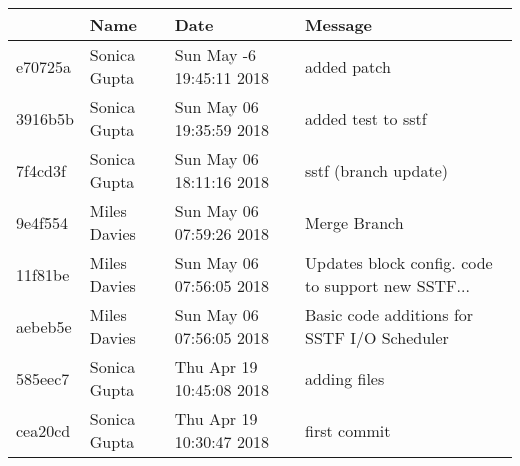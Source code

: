 \begin{table}[h]
\centering
\label{my-label}
\begin{tabular}{|l|l|l|l|}
\hline
        & Name         & Date                     & Message                                            \\ \hline
e70725a & Sonica Gupta & Sun May -6 19:45:11 2018 & added patch					       \\ \hline
3916b5b & Sonica Gupta & Sun May 06 19:35:59 2018 & added test to sstf				       \\ \hline
7f4cd3f & Sonica Gupta & Sun May 06 18:11:16 2018 & sstf (branch update) 			       \\ \hline
9e4f554 & Miles Davies & Sun May 06 07:59:26 2018 & Merge Branch			               \\ \hline
11f81be & Miles Davies & Sun May 06 07:56:05 2018 & Updates block config. code to support new SSTF...  \\ \hline
aebeb5e & Miles Davies & Sun May 06 07:56:05 2018 & Basic code additions for SSTF I/O Scheduler        \\ \hline
585eec7 & Sonica Gupta & Thu Apr 19 10:45:08 2018 & adding files	                               \\ \hline
cea20cd & Sonica Gupta & Thu Apr 19 10:30:47 2018 & first commit                                       \\ \hline
\end{tabular}
\end{table}
